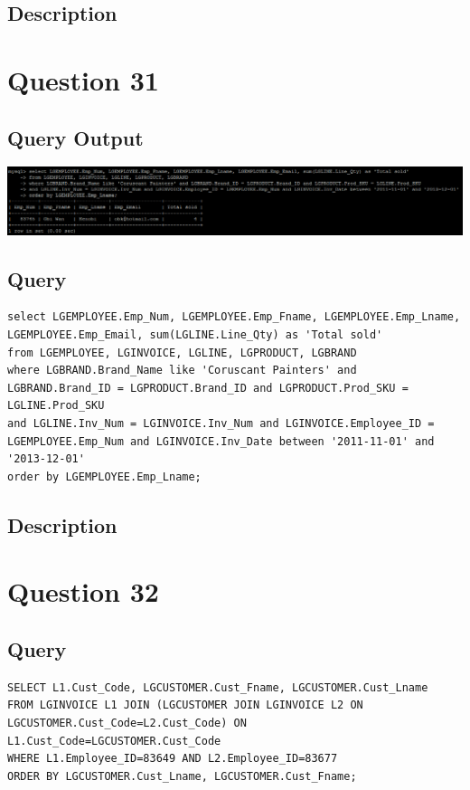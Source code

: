 \documentclass[a4paper,10pt]{article}
\begin{document}
\subsection{Description}
\section*{Question 31}
\subsection{Query Output}
           \includegraphics{Queries/Question_31/Question_31_screenshot.PNG}
 \subsection{Query}
          \lstset{
            language=SQL,
            breaklines=true
            }
        \begin{lstlisting}[frame=single]
        select LGEMPLOYEE.Emp_Num, LGEMPLOYEE.Emp_Fname, LGEMPLOYEE.Emp_Lname, LGEMPLOYEE.Emp_Email, sum(LGLINE.Line_Qty) as 'Total sold' 
from LGEMPLOYEE, LGINVOICE, LGLINE, LGPRODUCT, LGBRAND 
where LGBRAND.Brand_Name like 'Coruscant Painters' and LGBRAND.Brand_ID = LGPRODUCT.Brand_ID and LGPRODUCT.Prod_SKU = LGLINE.Prod_SKU 
and LGLINE.Inv_Num = LGINVOICE.Inv_Num and LGINVOICE.Employee_ID = LGEMPLOYEE.Emp_Num and LGINVOICE.Inv_Date between '2011-11-01' and '2013-12-01' 
order by LGEMPLOYEE.Emp_Lname;
        \end{lstlisting}
\subsection{Description}
\section*{Question 32}
 \subsection{Query}
          \lstset{
            language=SQL,
            breaklines=true
            }
        \begin{lstlisting}[frame=single]
        SELECT L1.Cust_Code, LGCUSTOMER.Cust_Fname, LGCUSTOMER.Cust_Lname
FROM LGINVOICE L1 JOIN (LGCUSTOMER JOIN LGINVOICE L2 ON LGCUSTOMER.Cust_Code=L2.Cust_Code) ON L1.Cust_Code=LGCUSTOMER.Cust_Code
WHERE L1.Employee_ID=83649 AND L2.Employee_ID=83677
ORDER BY LGCUSTOMER.Cust_Lname, LGCUSTOMER.Cust_Fname;

        \end{lstlisting}
\end{document}
